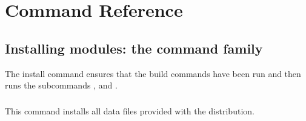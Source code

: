\documentclass{manual}
\begin{document}
\chapter{Command Reference}
\label{reference}








\section{Installing modules: the \protect{} command family}
\label{install-cmd}

The install command ensures that the build commands have been run and then
runs the subcommands ,
 and
.


\subsection{\protect{}}
\label{install-data-cmd}
This command installs all data files provided with the distribution.
\end{document}
